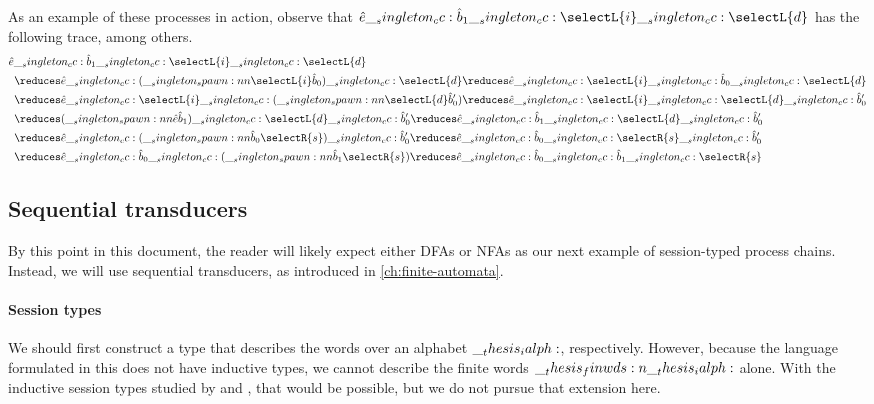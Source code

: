 As an example of these processes in action, observe that $\defp{e} \cc \defp{b}_1 \cc \selectL{i} \cc \selectL{d}$ has the following trace, among others.
\begin{align*}
  \MoveEqLeft[.5]
  \defp{e} \cc \defp{b}_1 \cc \selectL{i} \cc \selectL{d} \\
    &\reduces \defp{e} \cc (\spawn{\selectL{i}}{\defp{b}_0}) \cc \selectL{d}
     \reduces \defp{e} \cc \selectL{i} \cc \defp{b}_0 \cc \selectL{d} \\
    &\reduces \defp{e} \cc \selectL{i} \cc (\spawn{\selectL{d}}{\defp{b}'_0})
     \reduces \defp{e} \cc \selectL{i} \cc \selectL{d} \cc \defp{b}'_0 \\
    &\reduces (\spawn{\defp{e}}{\defp{b}_1}) \cc \selectL{d} \cc \defp{b}'_0
     \reduces \defp{e} \cc \defp{b}_1 \cc \selectL{d} \cc \defp{b}'_0 \\
    &\reduces \defp{e} \cc (\spawn{\defp{b}_0}{\selectR{s}}) \cc \defp{b}'_0
     \reduces \defp{e} \cc \defp{b}_0 \cc \selectR{s} \cc \defp{b}'_0 \\
    &\reduces \defp{e} \cc \defp{b}_0 \cc (\spawn{\defp{b}_1}{\selectR{s}})
     \reduces \defp{e} \cc \defp{b}_0 \cc \defp{b}_1 \cc \selectR{s}
\end{align*}



\subsection{Sequential transducers}

By this point in this document, the reader will likely expect either \acp{DFA} or \acp{NFA} as our next example of session-typed process chains.
Instead, we will use sequential transducers, as introduced in \cref{ch:finite-automata}.

\paragraph*{Session types}

We should first construct a type that describes the words over an alphabet $\__thesis_ialph:$, respectively.
However, because the language formulated in this  does not have inductive types, we cannot describe the finite words $\__thesis_finwds:n {\__thesis_ialph:}$ alone.
With the inductive session types studied by \textcite{Derakhshan+Pfenning:??} and \textcite{Somayyajula+Pfenning:??}, that would be possible, but we do not pursue that extension here.

